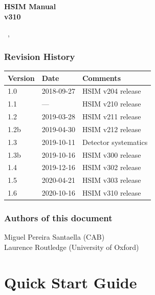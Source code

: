 \documentclass[12pt]{report}
\def\mydate{\leavevmode\hbox{\the\day~\monthname, \the\year}}
\begin{document}
\begin{titlepage}

\vspace*{4cm}
\begin{center}

{\selectfont
\Huge
\textbf{
HSIM Manual\\[0.5ex]
\Large
v310}
\vspace{2cm}

\large
\mydate
}
\end{center}
\vspace*{\fill}


\end{titlepage}

\tableofcontents

\vfill
\subsection*{Revision History}

\begin{table}[h]
\label{tab:revision}
\begin{tabular}{lll}
\hline
Version & Date & Comments \\
\hline
1.0 & 2018-09-27 & HSIM v204 release \\
1.1 & --- & HSIM v210 release \\
1.2 & 2019-03-28 & HSIM v211 release \\
1.2b & 2019-04-30 & HSIM v212 release \\
1.3 & 2019-10-11 & Detector systematics \\
1.3b & 2019-10-16 & HSIM v300 release \\
1.4 & 2019-12-16 & HSIM v302 release \\
1.5 & 2020-04-21 & HSIM v303 release \\
1.6 & 2020-10-16 & HSIM v310 release \\
\hline
\end{tabular}
\end{table}


\subsection*{Authors of this document}
Miguel Pereira Santaella (CAB) \\
Laurence Routledge (University of Oxford)

\clearpage

\chapter{Quick Start Guide}
\end{document}
